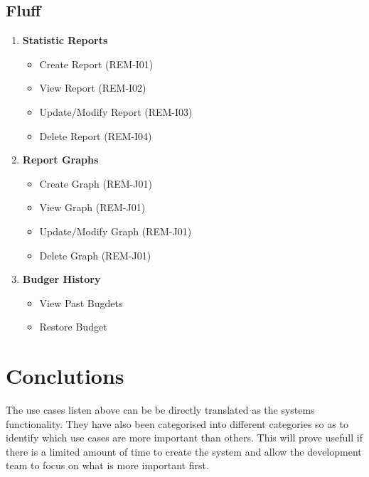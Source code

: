 \documentclass[11pt]{article}
\begin{document}
		\subsection{Fluff}
		\begin{enumerate}[i]
			\item \textbf{Statistic Reports}
			\begin{itemize}
				\item Create Report (REM-I01)
				\item View Report (REM-I02)
				\item Update/Modify Report (REM-I03)
				\item Delete Report (REM-I04)
			\end{itemize}
			
			\item \textbf{Report Graphs}
			\begin{itemize}
				\item Create Graph (REM-J01)
				\item View Graph (REM-J01)
				\item Update/Modify Graph (REM-J01)
				\item Delete Graph (REM-J01)
			\end{itemize}
			
			\item \textbf{Budger History}
			\begin{itemize}
				\item View Past Bugdets
				\item Restore Budget
			\end{itemize}
			
		\end{enumerate}
	
	\section{Conclutions}
	\begin{flushleft}
		The use cases listen above can be be directly translated as the systems functionality. They have also been categorised into different categories so as to identify which use cases are more important than others. This will prove usefull if there is a limited amount of time to create the system and allow the development team to focus on what is more important first.
	\end{flushleft}
	
\end{document}
